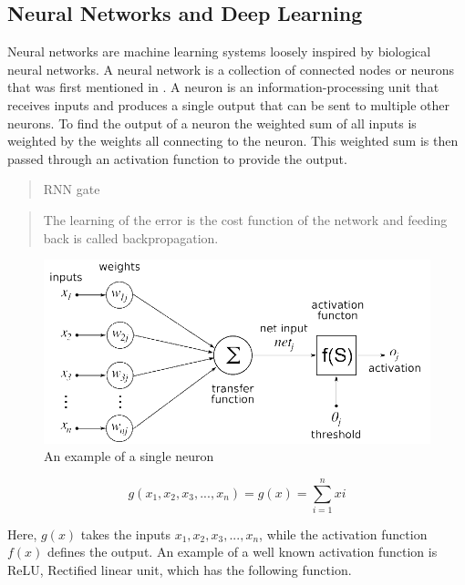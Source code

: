 \documentclass[nofilelist]{cslthse-msc}
\begin{document}
\subsection{Neural Networks and Deep Learning}

Neural networks are machine learning systems loosely inspired by biological neural networks. A neural network is a collection of connected nodes or neurons that was first mentioned in \citet{mcculloch1943}. A neuron \citep{dawson1998ann} is an information-processing unit that receives inputs and produces a single output that can be sent to multiple other neurons. To find the output of a neuron the weighted sum of all inputs is weighted by the weights all connecting to the neuron. This weighted sum is then passed through an activation function to provide the output.

\begin{quote}
RNN gate    
\end{quote}



\begin{quote}
    The learning of the error is the cost function of the network and feeding back is called backpropagation.

\end{quote}

\begin{figure}[htp]
    \centering
    \includegraphics[width=12cm]{msccls/explanatory_images/single_neuron.png}
    \caption{An example of a single neuron}
    \label{fig:neuron}
\end{figure}


\begin{equation}
    g(x_1, x_2, x_3,...,x_n) = g(x) = \sum_{i=1}^n  xi
\end{equation}

Here, $g(x)$ takes the inputs $x_1, x_2, x_3,...,x_n$, while the activation function $f(x)$ defines the output. An example of a well known activation function is ReLU, Rectified linear unit, which has the following function. 
\end{document}
